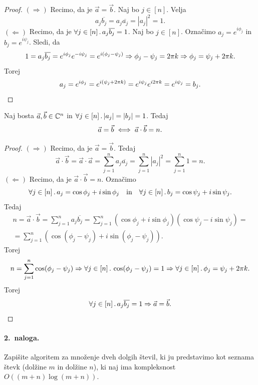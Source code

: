 \documentclass[11pt, a4paper]{article}
\begin{document}
\begin{proof}
    \((\Rightarrow)\) Recimo, da je \(\vec{a} = \vec{b}\). Naj bo \(j \in [n]\). Velja
    \[
        a_j\overline{b_j} = a_j \overline{a_j} = |a_j|^2 = 1.
    \]
    \((\Leftarrow)\) Recimo, da je \(\forall j \in [n] \,.\, a_j \overline{b_j} = 1\). Naj bo \(j \in [n]\). Označimo \(a_j = e^{i\phi_j}\) in \(b_j = e^{i \psi_j}\). Sledi, da
    \[
        1 = a_j \overline{b_j} = e^{i\phi_j}e^{-i \psi_j} = e^{i (\phi_j - \psi_j)} \Rightarrow \phi_j - \psi_j = 2 \pi k \Rightarrow \phi_j = \psi_j + 2 \pi k.
    \]
    Torej 
    \[
        a_j = e^{i\phi_j} = e^{i(\psi_j + 2 \pi k)} = e^{i\psi_j}e^{i2 \pi k} = e^{i\psi_j} = b_j. \qedhere
    \]
\end{proof}

\begin{trditev}
    Naj bosta \(\vec{a}, \vec{b} \in \mathbb{C}^n\) in \(\forall j \in [n] \,.\, |a_j| = |b_j| = 1\). Tedaj 
    \[
        \vec{a} = \vec{b} \iff \vec{a} \cdot \vec{b} = n.
    \]
\end{trditev}

\begin{proof}
    \((\Rightarrow)\) Recimo, da je \(\vec{a} = \vec{b}\). Tedaj 
    \[
        \vec{a} \cdot \vec{b} = \vec{a} \cdot \vec{a} = \sum_{j=1}^{n} a_j \overline{a_j} = \sum_{j=1}^{n} |a_j|^2 = \sum_{j=1}^{n} 1 = n.
    \]
    \((\Leftarrow)\) Recimo, da je \(\vec{a} \cdot \vec{b} = n\). Označimo 
    \[
        \forall j \in [n] \,.\, a_j = \cos \phi_j + i \sin \phi_j \quad \text{in} \quad \forall j \in [n] \,.\, b_j = \cos \psi_j + i \sin \psi_j.
    \]
    Tedaj 
    \begin{multline*}
        n = \vec{a} \cdot \vec{b} = \sum_{j=1}^{n} a_j \overline{b_j} = \sum_{j=1}^{n} (\cos \phi_j + i \sin \phi_j)(\cos \psi_j - i \sin \psi_j) = \\ = \sum_{j=1}^{n} (\cos (\phi_j - \psi_j) + i \sin (\phi_j - \psi_j)).
    \end{multline*}
    Torej 
    \[
        n = \sum_{j=1}^{n} \cos (\phi_j - \psi_j) \Rightarrow \forall j \in [n] \,.\, \cos(\phi_j - \psi_j) = 1 \Rightarrow \forall j \in [n] \,.\, \phi_j = \psi_j + 2 \pi k.
    \]
    Torej 
    \[
        \forall j \in [n] \,.\, a_j\overline{b_j} = 1 \Rightarrow \vec{a} = \vec{b}. \qedhere
    \]
\end{proof}
%
\paragraph{2.\ naloga.} Zapišite algoritem za množenje dveh dolgih števil, ki ju predstavimo kot seznama števk (dolžine \(m\) in dolžine \(n\)), ki naj ima kompleksnost \(O((m+n) \log(m+n))\).
%
\end{document}
